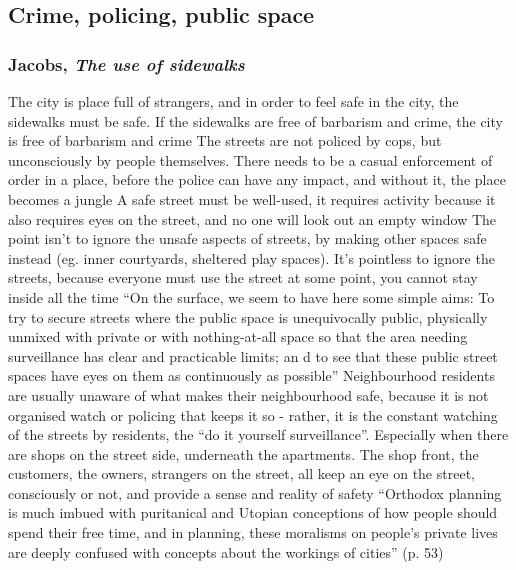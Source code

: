 \documentclass{article}
\begin{document}
\subsection{Crime, policing, public space}

\subsubsection{Jacobs, \textit{The use of sidewalks}}

\begin{outline}
	\1 The city is place full of strangers, and in order to feel safe in the city, the sidewalks must be safe. If the sidewalks are free of barbarism and crime, the city is free of barbarism and crime
	\1 The streets are not policed by cops, but unconsciously by people themselves. There needs to be a casual enforcement of order in a place, before the police can have any impact, and without it, the place becomes a jungle
	\1 A safe street must be well-used, it requires activity because it also requires eyes on the street, and no one will look out an empty window
	\1 The point isn't to ignore the unsafe aspects of streets, by making other spaces safe instead (eg. inner courtyards, sheltered play spaces). It's pointless to ignore the streets, because everyone must use the street at some point, you cannot stay inside all the time
	\1 ``On the surface, we seem to have here some simple aims: To try to secure streets where the public space is unequivocally public, physically unmixed with private or with nothing-at-all space so that the area needing surveillance has clear and practicable limits; an d to see that these public street spaces have eyes on them as continuously as possible''
	\1 Neighbourhood residents are usually unaware of what makes their neighbourhood safe, because it is not organised watch or policing that keeps it so - rather, it is the constant watching of the streets by residents, the ``do it yourself surveillance''. Especially when there are shops on the street side, underneath the apartments. The shop front, the customers, the owners, strangers on the street, all keep an eye on the street, consciously or not, and provide a sense and reality of safety
	\1 ``Orthodox planning is much imbued with puritanical and Utopian conceptions of how people should spend their free time, and in planning, these moralisms on people's private lives are deeply confused with concepts about the workings of cities'' (p. 53)
	\1 
\end{outline}
\end{document}
